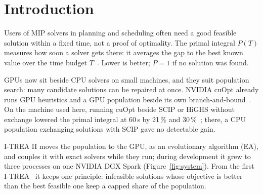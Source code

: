 \section{Introduction}\label{sec:intro}
Users of MIP solvers in planning and scheduling often need a good feasible solution within a fixed time, not a proof
of optimality. The primal integral $P(T)$ measures how soon a solver gets there: it averages the gap to the best known
value over the time budget $T$~\citep{berthold2013primal}. Lower is better; $P = 1$ if no solution was found.

GPUs now sit beside CPU solvers on small machines, and they suit population search: many candidate solutions can be
repaired at once. NVIDIA cuOpt already runs GPU heuristics and a GPU population beside its own
branch-and-bound~\citep{corduk2025gpuprimal,nvidia2026cuoptsrc}. On the machine used here, running cuOpt beside SCIP
or HiGHS without exchange lowered the primal integral at 60\,s by 21\,\% and 30\,\%~\citep{orbay2026optopt}; there, a
CPU population exchanging solutions with SCIP gave no detectable gain.

I-TREA II moves the population to the GPU, as an evolutionary algorithm (EA), and couples it with exact solvers while
they run; during development it grew to three processes on one NVIDIA DGX Spark (Figure~\ref{fig:system}). From the
first I-TREA~\citep{orbay2011itrea} it keeps one principle: infeasible solutions whose objective is better than the
best feasible one keep a capped share of the population.

